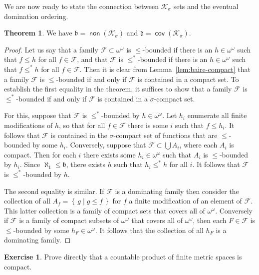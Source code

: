 \documentclass[11pt,oneside]{amsart}
\newcommand{\set}[1]{\left\{\,#1\,\right\}}
\DeclareMathOperator{\non}{\mathsf{non}}
\DeclareMathOperator{\cov}{\mathsf{cov}}
\theoremstyle{definition}
\newtheorem{exerc}{Exercise}[section]
\newtheorem{thm}{Theorem}[section]
\theoremstyle{definition}
\theoremstyle{remark}
\begin{document}
We are now ready to state the connection between $\mathcal K_\sigma$ sets and the eventual domination ordering.

\begin{thm}
  \label{thm:bd-vs-ksigma}
  We have $\mathfrak b=\non(\mathcal K_\sigma)$ and $\mathfrak d=\cov(\mathcal K_\sigma)$.
\end{thm}

\begin{proof}
  Let us say that a family $\mathcal F\subset\omega^\omega$ is $\leq$-bounded if there is an $h\in\omega^\omega$ such that $f\leq h$ for all $f\in\mathcal F$, and that $\mathcal F$ is $\leq^*$-bounded if there is an $h\in\omega^\omega$ such that $f\leq^*h$ for all $f\in\mathcal F$. Then it is clear from Lemma~\ref{lem:baire-compact} that a family $\mathcal F$ is $\leq$-bounded if and only if $\mathcal F$ is contained in a compact set. To establish the first equality in the theorem, it suffices to show that a family $\mathcal F$ is $\leq^*$-bounded if and only if $\mathcal F$ is contained in a $\sigma$-compact set.

  For this, suppose that $\mathcal F$ is $\leq^*$-bounded by $h\in\omega^\omega$. Let $h_i$ enumerate all finite modifications of $h$, so that for all $f\in\mathcal F$ there is some $i$ such that $f\leq h_i$. It follows that $\mathcal F$ is contained in the $\sigma$-compact set of functions that are $\leq$-bounded by some $h_i$. Conversely, suppose that $\mathcal F\subset\bigcup A_i$, where each $A_i$ is compact. Then for each $i$ there exists some $h_i\in\omega^\omega$ such that $A_i$ is $\leq$-bounded by $h_i$. Since $\aleph_1\leq\mathfrak b$, there exists $h$ such that $h_i\leq^*h$ for all $i$. It follows that $\mathcal F$ is $\leq^*$-bounded by $h$.

  The second equality is similar. If $\mathcal F$ is a dominating family then consider the collection of all $A_f=\set{g\mid g\leq f}$ for $f$ a finite modification of an element of $\mathcal F$. This latter collection is a family of compact sets that covers all of $\omega^\omega$. Conversely if $\mathcal F$ is a family of compact subsets of $\omega^\omega$ that covers all of $\omega^\omega$, then each $F\in\mathcal F$ is $\leq$-bounded by some $h_F\in\omega^\omega$. It follows that the collection of all $h_F$ is a dominating family.
\end{proof}

\begin{exerc}
  Prove directly that a countable product of finite metric spaces is compact.
\end{exerc}
\end{document}
